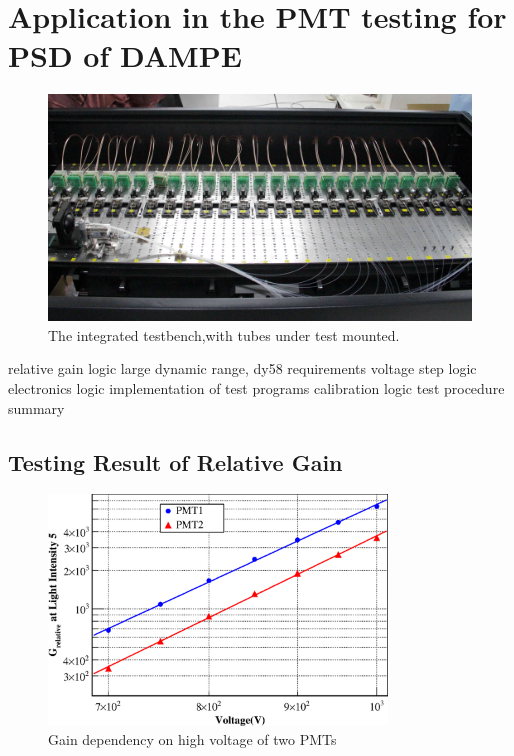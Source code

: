 \documentclass[5p, times]{elsarticle}
\begin{document}
\section{Application in the PMT testing for PSD of DAMPE}
\label{sec:application}

\begin{figure}[t]
 \centering
 \includegraphics[width=140mm]{integration1_crop}
\caption{The integrated testbench,with tubes under test mounted.}
\label{fig:testbench_integrated}
\end{figure}

relative gain logic
large dynamic range, dy58 requirements
voltage step logic
electronics logic
implementation of test programs
calibration logic
test procedure summary

\subsection{Testing Result of Relative Gain}
\label{sec:psd_gain}

\begin{figure}[h!]
 \centering
 \includegraphics[width=90mm]{gainVSvoltage}
\caption{Gain dependency on high voltage of two PMTs}
\label{fig:gainVSvoltage}
\end{figure} 
\end{document}
